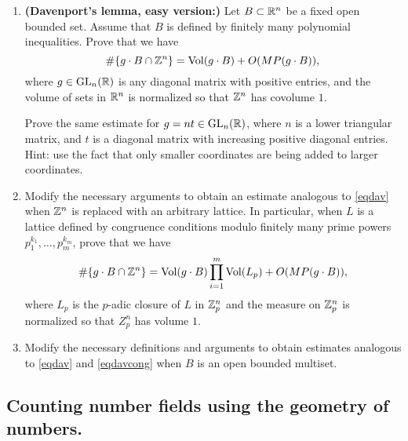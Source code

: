 \documentclass[12pt,amsfont]{amsart}
\begin{document}
\begin{enumerate}
\item
{\bf (Davenport's lemma, easy version:)}
Let $B\subset{\mathbb R}^n$ be a fixed open bounded set. 
Assume that $B$ is defined by finitely many polynomial inequalities.
Prove that we have
\begin{equation}\label{eqdav}
\#\{g\cdot B \cap {\mathbb Z}^n\}=\operatorname{Vol}(g\cdot B)+O(MP(g\cdot B)),
\end{equation}
where $g\in\operatorname{GL}_n({\mathbb R})$ is any diagonal matrix with positive entries,
and the volume of sets in ${\mathbb R}^n$ is normalized so that ${\mathbb Z}^n$ has
covolume $1$.

Prove the same estimate for $g=nt\in\operatorname{GL}_n({\mathbb R})$, where $n$ is a lower
triangular matrix, and $t$ is a diagonal matrix with increasing
positive diagonal entries. Hint: use the fact that only smaller
coordinates are being added to larger coordinates.

\item Modify the necessary arguments to obtain an estimate
analogous to \eqref{eqdav} when ${\mathbb Z}^n$ is replaced with an arbitrary
lattice. In particular, when $L$ is a lattice defined by congruence
conditions modulo finitely many prime powers
$p_1^{k_1},\ldots,p_m^{k_m}$, prove that we have
\begin{equation}\label{eqdavcong}
\#\{g\cdot B \cap {\mathbb Z}^n\}=\operatorname{Vol}(g\cdot B)\prod_{i=1}^m\operatorname{Vol}(L_p)+O(MP(g\cdot B)),
\end{equation}
where $L_p$ is the $p$-adic closure of $L$ in ${\mathbb Z}_p^n$ and the measure
on ${\mathbb Z}_p^n$ is normalized so that $Z_p^n$ has volume $1$.

\item Modify the necessary definitions and arguments to obtain
estimates analogous to \eqref{eqdav} and \eqref{eqdavcong} when $B$ is
an open bounded multiset.

\end{enumerate}


\subsection{
 {\bf Counting number fields using the geometry of numbers.}}
\end{document}
